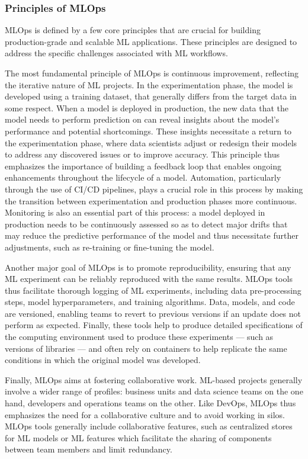 \documentclass[graybox]{svmult}
\begin{document}
\subsubsection{Principles of MLOps}
\label{sec:principles-mlops}

MLOps is defined by a few core principles that are crucial for building production-grade and scalable ML applications. These principles are designed to address the specific challenges associated with ML workflows.

The most fundamental principle of MLOps is continuous improvement, reflecting the iterative nature of ML projects. In the experimentation phase, the model is developed using a training dataset, that generally differs from the target data in some respect. When a model is deployed in production, the new data that the model needs to perform prediction on can reveal insights about the model's performance and potential shortcomings. These insights necessitate a return to the experimentation phase, where data scientists adjust or redesign their models to address any discovered issues or to improve accuracy. This principle thus emphasizes the importance of building a feedback loop that enables ongoing enhancements throughout the lifecycle of a model. Automation, particularly through the use of CI/CD pipelines, plays a crucial role in this process by making the transition between experimentation and production phases more continuous. Monitoring is also an essential part of this process: a model deployed in production needs to be continuously assessed so as to detect major drifts that may reduce the predictive performance of the model and thus necessitate further adjustments, such as re-training or fine-tuning the model.

Another major goal of MLOps is to promote reproducibility, ensuring that any ML experiment can be reliably reproduced with the same results. MLOps tools thus facilitate thorough logging of ML experiments, including data pre-processing steps, model hyperparameters, and training algorithms. Data, models, and code are versioned, enabling teams to revert to previous versions if an update does not perform as expected. Finally, these tools help to produce detailed specifications of the computing environment used to produce these experiments — such as versions of libraries — and often rely on containers to help replicate the same conditions in which the original model was developed.

Finally, MLOps aims at fostering collaborative work. ML-based projects generally involve a wider range of profiles: business units and data science teams on the one hand, developers and operations teams on the other. Like DevOps, MLOps thus emphasizes the need for a collaborative culture and to avoid working in silos. MLOps tools generally include collaborative features, such as centralized stores for ML models or ML features which facilitate the sharing of components between team members and limit redundancy.
\end{document}
